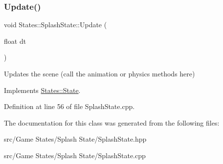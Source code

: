 \subsubsection{\texorpdfstring{Update()}{Update()}}
{\footnotesize\ttfamily void States\+::\+Splash\+State\+::\+Update (\begin{DoxyParamCaption}\item[{float}]{dt }\end{DoxyParamCaption})\hspace{0.3cm}{\ttfamily [virtual]}}



Updates the scene (call the animation or physics methods here) 

\begin{DoxyVerb}\end{DoxyVerb}
 

Implements \mbox{\hyperlink{class_states_1_1_state_ab8e935def8138e0b917c3228a29904e4}{States\+::\+State}}.



Definition at line 56 of file Splash\+State.\+cpp.


\begin{DoxyCode}{0}

\end{DoxyCode}


The documentation for this class was generated from the following files\+:\begin{DoxyCompactItemize}
\item 
src/\+Game States/\+Splash State/Splash\+State.\+hpp\item 
src/\+Game States/\+Splash State/Splash\+State.\+cpp\end{DoxyCompactItemize}
